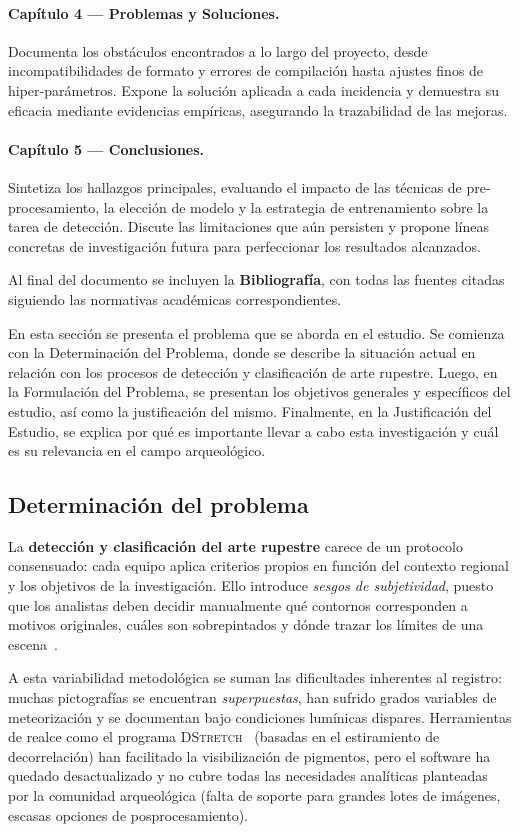 \paragraph{Capítulo 4 — Problemas y Soluciones.}
Documenta los obstáculos encontrados a lo largo del proyecto, desde incompatibilidades de formato y errores de compilación hasta ajustes finos de hiper-parámetros.
Expone la solución aplicada a cada incidencia y demuestra su eficacia mediante evidencias empíricas, asegurando la trazabilidad de las mejoras.

\paragraph{Capítulo 5 — Conclusiones.}
Sintetiza los hallazgos principales, evaluando el impacto de las técnicas de pre-procesamiento, la elección de modelo y la estrategia de entrenamiento sobre la tarea de detección.
Discute las limitaciones que aún persisten y propone líneas concretas de investigación futura para perfeccionar los resultados alcanzados.

\bigskip
Al final del documento se incluyen la \textbf{Bibliografía}, con todas las fuentes citadas siguiendo las normativas académicas correspondientes.

En esta sección se presenta el problema que se aborda en el estudio.
Se comienza con la Determinación del Problema, donde se describe la situación actual en relación con los procesos de detección y clasificación de arte rupestre.
Luego, en la Formulación del Problema, se presentan los objetivos generales y específicos del estudio, así como la justificación del mismo.
Finalmente, en la Justificación del Estudio, se explica por qué es importante llevar a cabo esta investigación y cuál es su relevancia en el campo arqueológico.

\subsection{Determinación del problema}

La \textbf{detección y clasificación del arte rupestre} carece de un protocolo consensuado: cada equipo aplica criterios propios en función del contexto regional y los objetivos de la investigación.
Ello introduce \emph{sesgos de subjetividad}, puesto que los analistas deben decidir manualmente qué contornos corresponden a motivos originales, cuáles son sobrepintados y dónde trazar los límites de una escena~\cite{aschero2012}.

A esta variabilidad metodológica se suman las dificultades inherentes al registro: muchas pictografías se encuentran \emph{superpuestas}, han sufrido grados variables de meteorización y se documentan bajo condiciones lumínicas dispares.
Herramientas de realce como el programa \textsc{DStretch}~\cite{dstretch} (basadas en el estiramiento de decorrelación) han facilitado la visibilización de pigmentos, pero el software ha quedado desactualizado y no cubre todas las necesidades analíticas planteadas por la comunidad arqueológica (falta de soporte para grandes lotes de imágenes, escasas opciones de posprocesamiento).

